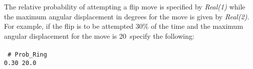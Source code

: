 The relative probability of attempting a flip move is 
specified by {\it Real(1)} while the maximum angular displacement 
in degrees for the move is given by {\it Real(2)}. 
For example, if the flip is to be attempted 30\% of the 
time and the maximum angular displacement for the 
move is 20\degree~specify the following: \\ \\
%
\texttt{
\# Prob\_Ring \\
0.30 20.0 \\ \\}
%
%
%
%
